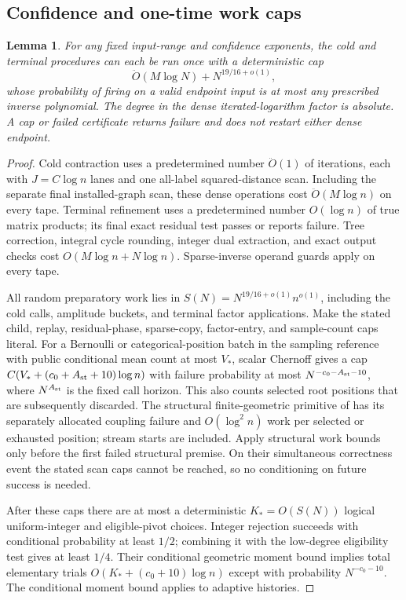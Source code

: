 \documentclass[11pt]{article}
\newtheorem{lemma}[theorem]{Lemma}
\theoremstyle{remark}
\renewcommand{\O}{\ddot{O}}
\begin{document}
\subsection{Confidence and one-time work caps}

\begin{lemma}
\label{lem:ram27-endpoint-caps}
For any fixed input-range and confidence exponents, the cold and terminal
procedures can each be run once with a deterministic cap
\[
 \O(M\log N)
       +N^{19/16+o(1)},
\]
whose probability of firing on a valid endpoint input is at most any prescribed
inverse polynomial.
The degree in the dense iterated-logarithm factor is absolute.
A cap or failed certificate returns failure and does not restart either dense
endpoint.
\end{lemma} \begin{proof} Cold contraction uses a predetermined number $\O(1)$ of iterations, each with
$J=C \log n$ lanes and one all-label squared-distance scan.
Including the separate final installed-graph scan, these dense operations cost
$\O(M\log n)$ on every tape.
Terminal refinement uses a predetermined number $O(\log n)$ of true matrix products;
its final exact residual test passes or reports failure.
Tree correction, integral cycle rounding, integer dual extraction, and exact
output checks cost $O(M\log n+N\log n)$.
Sparse-inverse operand guards apply on every tape.

All random preparatory work lies in $S(N)=N^{19/16+o(1)}n^{o(1)}$, including the
cold calls, amplitude buckets, and terminal factor applications.
Make the stated child, replay, residual-phase, sparse-copy, factor-entry, and
sample-count caps literal.
For a Bernoulli or categorical-position batch in the sampling reference with
public conditional mean count at most $V_*$, scalar Chernoff gives a cap
$C(V_*+(c_0+A_{\rm st}+10)\log n)$ with failure probability at most $N^{-c_0-A_{\rm st}-10}$, where
$N^{A_{\rm st}}$ is the fixed call horizon.
This also counts selected root positions that are subsequently discarded.
The structural finite-geometric primitive of  has
its separately allocated coupling failure and $O(\log^2 n)$ work per selected or
exhausted position; stream starts are included.
Apply structural work bounds only before the first failed structural premise.
On their simultaneous correctness event the stated scan caps cannot be reached,
so no conditioning on future success is needed.

After these caps there are at most a deterministic $K_*=O(S(N))$ logical
uniform-integer and eligible-pivot choices.
Integer rejection succeeds with conditional probability at least $1/2$;
combining it with the low-degree eligibility test gives at least $1/4$.
Their conditional geometric moment bound implies total elementary trials
$O(K_*+(c_0+10)\log n)$ except with probability $N^{-c_0-10}$.
The conditional moment bound applies to adaptive histories.


\end{proof}
\end{document}
